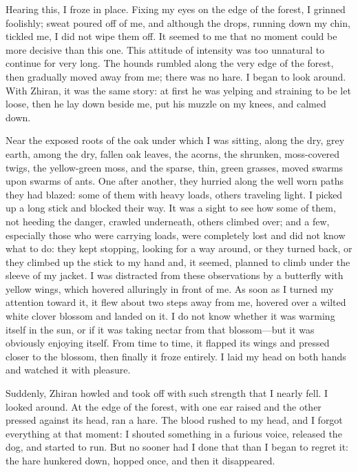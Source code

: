 Hearing this, I froze in place. Fixing my eyes on the edge of the forest, I grinned foolishly; sweat poured off of me, and although the drops, running down my chin, tickled me, I did not wipe them off. It seemed to me that no moment could be more decisive than this one. This attitude of intensity was too unnatural to continue for very long. The hounds rumbled along the very edge of the forest, then gradually moved away from me; there was no hare. I began to look around. With Zhiran, it was the same story: at first he was yelping and straining to be let loose, then he lay down beside me, put his muzzle on my knees, and calmed down.

Near the exposed roots of the oak under which I was sitting, along the dry, grey earth, among the dry, fallen oak leaves, the acorns, the shrunken, moss-covered twigs, the yellow-green moss, and the sparse, thin, green grasses, moved swarms upon swarms of ants. One after another, they hurried along the well worn paths they had blazed: some of them with heavy loads, others traveling light. I picked up a long stick and blocked their way. It was a sight to see how some of them, not heeding the danger, crawled underneath, others climbed over; and a few, especially those who were carrying loads, were completely lost and did not know what to do: they kept stopping, looking for a way around, or they turned back, or they climbed up the stick to my hand and, it seemed, planned to climb under the sleeve of my jacket. I was distracted from these observations by a butterfly with yellow wings, which hovered alluringly in front of me. As soon as I turned my attention toward it, it flew about two steps away from me, hovered over a wilted white clover blossom and landed on it. I do not know whether it was warming itself in the sun, or if it was taking nectar from that blossom---but it was obviously enjoying itself. From time to time, it flapped its wings and pressed closer to the blossom, then finally it froze entirely. I laid my head on both hands and watched it with pleasure.

Suddenly, Zhiran howled and took off with such strength that I nearly fell. I looked around. At the edge of the forest, with one ear raised and the other pressed against its head, ran a hare. The blood rushed to my head, and I forgot everything at that moment: I shouted something in a furious voice, released the dog, and started to run. But no sooner had I done that than I began to regret it: the hare hunkered down, hopped once, and then it disappeared.

